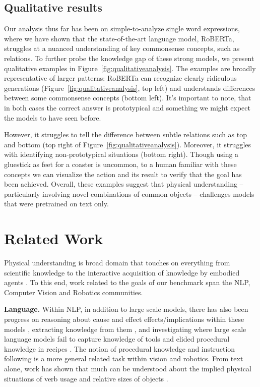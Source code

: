\subsection{Qualitative results} Our analysis thus far has been on simple-to-analyze single word expressions, where we have shown that the state-of-the-art language model, RoBERTa, struggles at a nuanced understanding of key commonsense concepts, such as relations. To further probe the knowledge gap of these strong models, we present qualitative examples in Figure~\ref{fig:qualitativeanalysis}. The examples are broadly representative of larger patterns: RoBERTa can recognize clearly ridiculous generations (Figure~\ref{fig:qualitativeanalysis}, top left) and understands differences between some commonsense concepts (bottom left). It's important to note, that in both cases the correct answer is prototypical and something we might expect the models to have seen before.

However, it struggles to tell the difference between subtle relations such as top and bottom (top right of Figure~\ref{fig:qualitativeanalysis}). Moreover, it struggles with identifying non-prototypical situations (bottom right). Though using a gluestick as feet for a coaster is uncommon, to a human familiar with these concepts we can visualize the action and its result to verify that the goal has been achieved. Overall, these examples suggest that physical understanding -- particularly involving novel combinations of common objects -- challenges models that were pretrained on text only.

\section{Related Work} Physical understanding is broad domain that touches on everything from scientific knowledge \cite{Schoenick2016} to the interactive acquisition of knowledge by embodied agents \cite{Thomason2016}. To this end, work related to the goals of our benchmark span the NLP, Computer Vision and Robotics communities.

\textbf{Language.} Within NLP, in addition to large scale models, there has also been progress on reasoning about cause and effect effects/implications within these models \cite{Bosselut2019}, extracting knowledge from them \cite{Petroni2019}, and investigating where large scale language models fail to capture knowledge of tools and elided procedural knowledge in recipes \cite{Bisk2019}.  The notion of procedural knowledge and instruction following is a more general related task within vision and robotics.  From text alone, work has shown that much can be understood about the implied physical situations of verb usage \cite{Forbes2017} and relative sizes of objects \cite{Elazar2019}.

